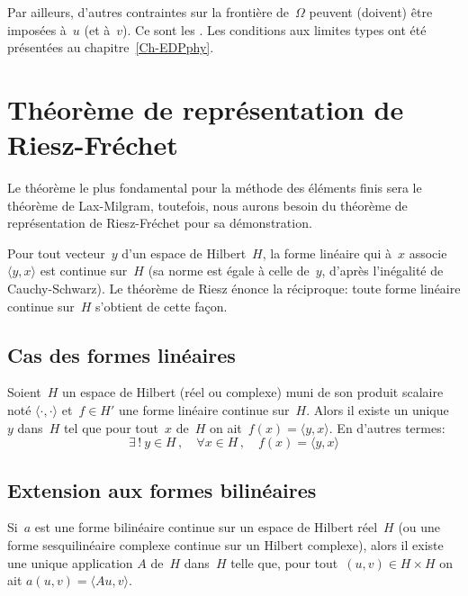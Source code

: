 \medskip
Par ailleurs, d'autres contraintes sur la frontière de~$\Omega$ peuvent (doivent) être imposées à~$u$ (et à~$v$). Ce sont les .
Les conditions aux limites types ont été présentées au chapitre~\ref{Ch-EDPphy}.

\medskip
\section{Théorème de représentation de Riesz-Fréchet}
Le théorème le plus fondamental pour la méthode des éléments finis sera le théorème de Lax-Milgram, toutefois, nous aurons besoin du théorème de représentation de Riesz-Fréchet pour sa démonstration. 

\medskip
Pour tout vecteur~$y$ d'un espace de Hilbert~$H$, la forme linéaire qui à~$x$ associe~$\langle y,x\rangle$ est continue sur~$H$ (sa norme est égale à celle de~$y$, d'après l'inégalité de Cauchy-Schwarz). Le théorème de Riesz énonce la réciproque: toute forme linéaire continue sur~$H$ s'obtient de cette façon.

\medskip
\subsection{Cas des formes linéaires}

\begin{theoreme}\label{Th-RF}
Soient~$H$ un espace de Hilbert (réel ou complexe) muni de son produit scalaire noté $\langle\cdot,\cdot\rangle$ et~$f \in H'$ une forme linéaire continue sur~$H$.
Alors il existe un unique~$y$ dans~$H$ tel que pour tout~$x$ de~$H$ on ait~$f(x)=\langle y,x\rangle$. En d'autres termes:
\begin{equation}
\exists\,!\ y \in H\,, \quad \forall x\in H\,, \quad f(x) = \langle y,x\rangle
\end{equation}
\end{theoreme}

\medskip
\subsection{Extension aux formes bilinéaires}

%
Si~$a$ est une forme bilinéaire continue sur un espace de Hilbert réel~$H$ (ou une forme sesquilinéaire complexe continue sur un Hilbert complexe), alors il existe une unique application $A$ de~$H$ dans~$H$ telle que, pour tout~$(u,v)\in H\times H$ on ait $a(u,v)=\langle Au,v \rangle$.

